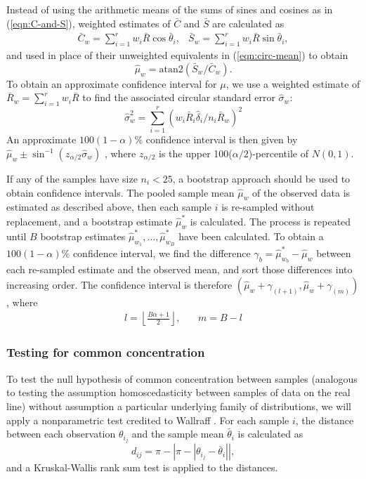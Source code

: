 \documentclass[../../ArchStats.tex]{subfiles}
\begin{document}
Instead of using the arithmetic means of the sums of sines and cosines as in (\ref{eqn:C-and-S}), weighted estimates of $\bar{C}$ and $\bar{S}$ are calculated as
	\[ \begin{matrix*}
	\bar{C}_w = \sum_{i=1}^r w_i \bar{R} \cos \bar{\theta}_i, & 
	\bar{S}_w = \sum_{i=1}^r w_i \bar{R} \sin \bar{\theta}_i,
	\end{matrix*} \]
and used in place of their unweighted equivalents in (\ref{eqn:circ-mean}) to obtain
\[\hat{\mu}_w = \text{atan2}(\bar{S}_w/\bar{C}_w).\]
To obtain an approximate confidence interval for $\mu$, we use a weighted estimate of $\bar{R}_w = \sum_{i=1}^r w_i \bar{R}$ to find the associated circular standard error $\hat{\sigma}_w$:
\[ \hat{\sigma}_w^2 = \sum_{i=1}^r \left( w_i \bar{R}_i \hat{\delta}_i / n_i \bar{R}_w \right) ^2\]
An approximate $100(1-\alpha)$\% confidence interval is then given by
 $ \hat{\mu}_w \pm \sin^{-1}(z_{\alpha/2} \hat{\sigma}_w)$ ,
where $z_{\alpha/2}$ is the upper 100($\alpha/2$)-percentile of $N(0,1)$.


If any of the samples have size $n_i < 25$, a bootstrap approach should be used to obtain confidence intervals. The pooled sample mean $\hat{\mu}_w$ of the observed data is estimated as described above, then each sample $i$ is re-sampled without replacement, and a bootstrap estimate $\hat{\mu}^*_w$ is calculated. The process is repeated until $B$ bootstrap estimates $\hat{\mu}^*_{w_1}, \dots, \hat{\mu}^*_{w_B}$ have been calculated. To obtain a $100(1-\alpha)$\% confidence interval, we find the difference $\gamma_b = \hat{\mu}^*_{w_b} - \hat{\mu}_w$ between each re-sampled estimate and the observed mean, and sort those differences into increasing order. The confidence interval is therefore $(\hat{\mu}_w + \gamma_{(l+1)}, \hat{\mu}_w + \gamma_{(m)})$, where
\[\begin{matrix*}
l = \left\lfloor \frac{B\alpha + 1}{2} \right\rfloor, & \, & m = B-l
\end{matrix*} \]

\subsubsection{Testing for common concentration}
\label{sec:common-concentration}

To test the null hypothesis of common concentration between samples (analogous to testing the assumption homoscedasticity between samples of data on the real line) without assumption a particular underlying family of distributions, we will apply a nonparametric test credited to Wallraff \cite{Wallraff1979}. For each sample $i$, the distance between each observation $\theta_{i_j}$ and the sample mean $\bar{\theta}_i$ is calculated as
\[d_{ij} = \pi - \left\vert \pi - \left\vert \theta_{i_j} - \bar{\theta}_i \right\vert \right\vert, \]
and a Kruskal-Wallis rank sum test is applied to the distances.
\end{document}
